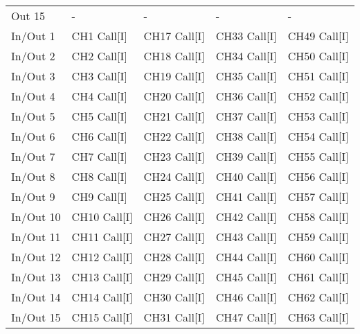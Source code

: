 \documentclass[]{article}
\begin{document}
\begin{table}[h]
{\begin{tabular}{lllll}
			Out 15          & -                      & -                       & -                       & -                       \\
			In/Out 1        & CH1 Call{[}I{]}        & CH17 Call{[}I{]}        & CH33 Call{[}I{]}        & CH49 Call{[}I{]}        \\
			In/Out 2        & CH2 Call{[}I{]}        & CH18 Call{[}I{]}        & CH34 Call{[}I{]}        & CH50 Call{[}I{]}        \\
			In/Out 3        & CH3 Call{[}I{]}        & CH19 Call{[}I{]}        & CH35 Call{[}I{]}        & CH51 Call{[}I{]}        \\
			In/Out 4        & CH4 Call{[}I{]}        & CH20 Call{[}I{]}        & CH36 Call{[}I{]}        & CH52 Call{[}I{]}        \\
			In/Out 5        & CH5 Call{[}I{]}        & CH21 Call{[}I{]}        & CH37 Call{[}I{]}        & CH53 Call{[}I{]}        \\
			In/Out 6        & CH6 Call{[}I{]}        & CH22 Call{[}I{]}        & CH38 Call{[}I{]}        & CH54 Call{[}I{]}        \\
			In/Out 7        & CH7 Call{[}I{]}        & CH23 Call{[}I{]}        & CH39 Call{[}I{]}        & CH55 Call{[}I{]}        \\
			In/Out 8        & CH8 Call{[}I{]}        & CH24 Call{[}I{]}        & CH40 Call{[}I{]}        & CH56 Call{[}I{]}        \\
			In/Out 9        & CH9 Call{[}I{]}        & CH25 Call{[}I{]}        & CH41 Call{[}I{]}        & CH57 Call{[}I{]}        \\
			In/Out 10       & CH10 Call{[}I{]}       & CH26 Call{[}I{]}        & CH42 Call{[}I{]}        & CH58 Call{[}I{]}        \\
			In/Out 11       & CH11 Call{[}I{]}       & CH27 Call{[}I{]}        & CH43 Call{[}I{]}        & CH59 Call{[}I{]}        \\
			In/Out 12       & CH12 Call{[}I{]}       & CH28 Call{[}I{]}        & CH44 Call{[}I{]}        & CH60 Call{[}I{]}        \\
			In/Out 13       & CH13 Call{[}I{]}       & CH29 Call{[}I{]}        & CH45 Call{[}I{]}        & CH61 Call{[}I{]}        \\
			In/Out 14       & CH14 Call{[}I{]}       & CH30 Call{[}I{]}        & CH46 Call{[}I{]}        & CH62 Call{[}I{]}        \\
			In/Out 15       & CH15 Call{[}I{]}       & CH31 Call{[}I{]}        & CH47 Call{[}I{]}        & CH63 Call{[}I{]}        \\

\end{tabular}}
\end{table}
\end{document}
